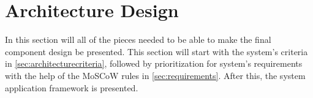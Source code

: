 \section{Architecture Design} \label{sec:architecturedesign}
In this section will all of the pieces needed to be able to make the final component design be presented.
This section will start with the system's criteria in \cref{sec:architecturecriteria}, followed by prioritization for system's requirements with the help of the MoSCoW rules in \cref{sec:requirements}.
After this, the system application framework is presented.



%

